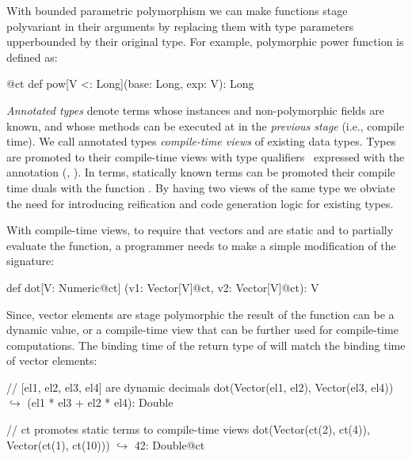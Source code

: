 With bounded parametric polymorphism we can make functions stage polyvariant in their arguments by replacing them with
type parameters upperbounded by their original type. For example, polymorphic power function is defined as:\begin{lstparagraph}
@ct def pow[V <: Long](base: Long, exp: V): Long
\end{lstparagraph}

\emph{Annotated types} denote terms whose instances and non-polymorphic fields are known, and
 whose methods can be executed at in the \emph{previous stage} (i.e., compile time). We call annotated types \emph{compile-time views}
 of existing data types. Types are promoted to their compile-time views with type qualifiers~\cite{foster1999theory} expressed with
 the  annotation (\eg, ). In terms, statically known terms can be promoted
 their compile time duals with the function . By having two views of the same type
 we obviate the need for introducing reification and code generation logic for existing types.

With compile-time views, to require that vectors  and  are
 static and to partially evaluate the function, a programmer needs to make
 a simple modification of the  signature:\begin{lstparagraph}
def dot[V: Numeric@ct]
  (v1: Vector[V]@ct, v2: Vector[V]@ct): V
\end{lstparagraph}

Since, vector elements are stage polymorphic the result
 of the function can be a dynamic value, or a compile-time view
 that can be further used for compile-time computations. The binding time of
 the return type of  will match the binding time of vector elements:\begin{lstparagraph}
  // [el1, el2, el3, el4] are dynamic decimals
  dot(Vector(el1, el2), Vector(el3, el4))
    $\hookrightarrow$ (el1 * el3 + el2 * el4): Double

  // ct promotes static terms to compile-time views
  dot(Vector(ct(2), ct(4)), Vector(ct(1), ct(10)))
    $\hookrightarrow$ 42: Double@ct
\end{lstparagraph}


